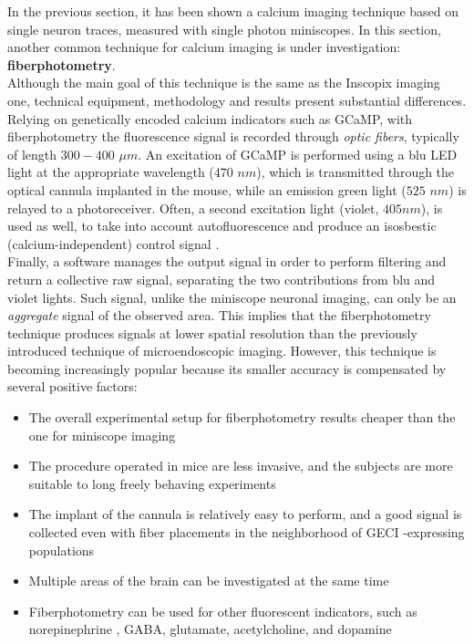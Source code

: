 \documentclass[12pt, a4paper]{report}
\begin{document}
In the previous section, it has been shown a calcium imaging technique based on single neuron traces, measured with single photon miniscopes. In this section, another common technique for calcium imaging is under investigation: \textbf{fiberphotometry}. \\
Although the main goal of this technique is the same as the Inscopix imaging one, technical equipment, methodology and results present substantial differences.\\
Relying on genetically encoded calcium indicators such as GCaMP, with fiberphotometry the fluorescence signal is recorded through \textit{optic fibers}, typically of length $300-400$ $ \mu m$. An excitation of GCaMP is performed using a blu LED light at the appropriate wavelength ($470$ $ nm$), which is transmitted through the optical cannula implanted in the mouse, while an emission green light ($525$ $ nm$) is relayed to a photoreceiver. Often, a second excitation light (violet, $405 nm$), is used as well, to take into account autofluorescence and produce an isosbestic (calcium-independent) control signal \cite{12}. \\%
 Finally, a software manages the output signal in order to perform filtering and return a collective raw signal, separating the two contributions from blu and violet lights. Such signal, unlike the miniscope neuronal imaging, can only be an \textit{aggregate} signal of the observed area. This implies that the fiberphotometry technique produces signals at lower spatial resolution than the previously introduced technique of microendoscopic imaging. However, this technique is becoming increasingly popular because its smaller accuracy is compensated by several positive factors:

\begin{itemize}
	
	\item The overall experimental setup for fiberphotometry results cheaper than the one for miniscope imaging 
	
	\item The procedure operated in mice are less invasive, and the subjects are more suitable to long freely behaving experiments
	
	\item The implant of the cannula is relatively easy to perform, and a good signal is collected even with fiber placements in the neighborhood of GECI -expressing populations 
	
	\item Multiple areas of the brain can be investigated at the same time 
	
	\item Fiberphotometry can be used for other fluorescent indicators, such as norepinephrine , %
	 GABA, %
	 glutamate,%
	acetylcholine,%
	and dopamine \cite{12} %
	
	
	
\end{itemize}
\end{document}
